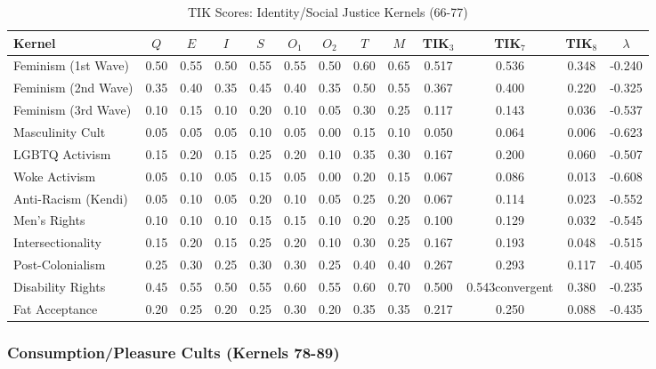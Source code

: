 \documentclass[11pt,a4paper]{article}
\theoremstyle{definition}
\theoremstyle{remark}
\begin{document}
\begin{table}[H]
\centering
\caption{TIK Scores: Identity/Social Justice Kernels (66-77)}
\label{tab:tik-identity}
\small
\begin{tabular}{@{}l|ccccccc|c|cccc@{}}
\toprule
\textbf{Kernel} & $Q$ & $E$ & $I$ & $S$ & $O_1$ & $O_2$ & $T$ & $M$ & \textbf{TIK$_3$} & \textbf{TIK$_7$} & \textbf{TIK$_8$} & $\lambda$ \\
\midrule
Feminism (1st Wave) & 0.50 & 0.55 & 0.50 & 0.55 & 0.55 & 0.50 & 0.60 & 0.65 & 0.517 & 0.536 & 0.348 & -0.240 \\
Feminism (2nd Wave) & 0.35 & 0.40 & 0.35 & 0.45 & 0.40 & 0.35 & 0.50 & 0.55 & 0.367 & 0.400 & 0.220 & -0.325 \\
Feminism (3rd Wave) & 0.10 & 0.15 & 0.10 & 0.20 & 0.10 & 0.05 & 0.30 & 0.25 & 0.117 & 0.143 & 0.036 & -0.537 \\
Masculinity Cult & 0.05 & 0.05 & 0.05 & 0.10 & 0.05 & 0.00 & 0.15 & 0.10 & 0.050 & 0.064 & 0.006 & -0.623 \\
LGBTQ Activism & 0.15 & 0.20 & 0.15 & 0.25 & 0.20 & 0.10 & 0.35 & 0.30 & 0.167 & 0.200 & 0.060 & -0.507 \\
Woke Activism & 0.05 & 0.10 & 0.05 & 0.15 & 0.05 & 0.00 & 0.20 & 0.15 & 0.067 & 0.086 & 0.013 & -0.608 \\
Anti-Racism (Kendi) & 0.05 & 0.10 & 0.05 & 0.20 & 0.10 & 0.05 & 0.25 & 0.20 & 0.067 & 0.114 & 0.023 & -0.552 \\
Men's Rights & 0.10 & 0.10 & 0.10 & 0.15 & 0.15 & 0.10 & 0.20 & 0.25 & 0.100 & 0.129 & 0.032 & -0.545 \\
Intersectionality & 0.15 & 0.20 & 0.15 & 0.25 & 0.20 & 0.10 & 0.30 & 0.25 & 0.167 & 0.193 & 0.048 & -0.515 \\
Post-Colonialism & 0.25 & 0.30 & 0.25 & 0.30 & 0.30 & 0.25 & 0.40 & 0.40 & 0.267 & 0.293 & 0.117 & -0.405 \\
Disability Rights & 0.45 & 0.55 & 0.50 & 0.55 & 0.60 & 0.55 & 0.60 & 0.70 & 0.500 & 0.543convergent & 0.380 & -0.235 \\
Fat Acceptance & 0.20 & 0.25 & 0.20 & 0.25 & 0.30 & 0.20 & 0.35 & 0.35 & 0.217 & 0.250 & 0.088 & -0.435 \\
\bottomrule
\end{tabular}
\end{table}

\subsubsection{Consumption/Pleasure Cults (Kernels 78-89)}
\end{document}
